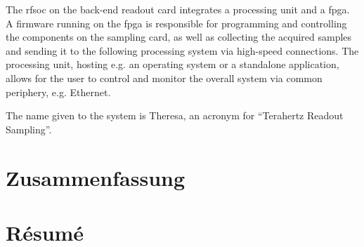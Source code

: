 The \gls{rfsoc} on the back-end readout card integrates a processing unit and a \gls{fpga}. 
A firmware running on the \gls{fpga} is responsible for programming and controlling the components on the sampling card, as well as collecting the acquired samples and sending it to the following processing system via high-speed connections.
The processing unit, hosting e.g. an operating system or a standalone application, allows for the user to control and monitor the overall system via common periphery, e.g. Ethernet.

The name given to the system is Theresa, an acronym for ``Terahertz Readout Sampling''.
\chapter*{Zusammenfassung}
\chapter*{Résumé}